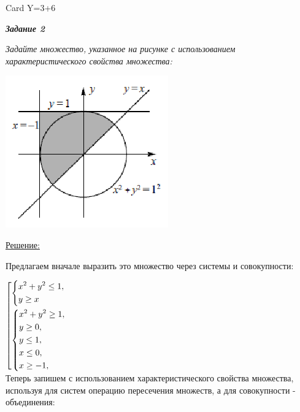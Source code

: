 \documentclass[11pt]{article}
\begin{document}
Card Y=3+6

\pagebreak

\textit{\textbf{Задание 2}}

\textit{Задайте множество, указанное на рисунке с использованием
характеристического свойства множества:}

\includegraphics{task2}

\underline{Решение:}

Предлагаем вначале выразить это множество через системы и
совокупности:

$\left[ 
  \begin{gathered} 
    \left\{ 
      \begin{gathered} 
                  x^2 + y^2 \leq 1, \hfill 
        \\ 
        y \geq x \hfill 
        \\ 
      \end{gathered} 
    \right. \hfill 
    \\ 
    \left\{ 
      \begin{gathered} 
                  x^2+y^2 \geq 1, \hfill 
        \\ 
        y \geq 0, \hfill 
        \\ 
        y \leq 1, \hfill 
        \\ 
        x \leq 0, \hfill 
        \\ 
        x \geq -1, \hfill 
        \\ 
      \end{gathered} 
    \right. \hfill 
    \\ 
  \end{gathered} 
\right.$
\\[3pt]

Теперь запишем с использованием характеристического
свойства множества, используя для систем операцию пересечения
множеств, а для совокупности - объединения:
\end{document}
